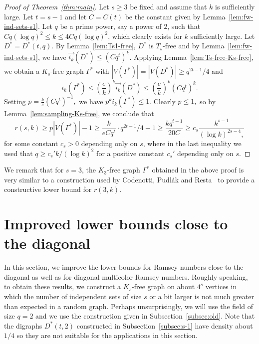 \documentclass{article}
\theoremstyle{plain}
\theoremstyle{definition}
\newcommand{\fwi}[1]{\overrightarrow{i_{#1}}}
\begin{document}
\begin{proof}[Proof of Theorem~\ref{thm:main}]
    Let $s \ge 3$ be fixed and assume that $k$ is sufficiently large. Let $t = s-1$ and let $C = C(t)$ be the constant given by Lemma~\ref{lem:fw-ind-sets-s1}. Let $q$ be a prime power, say a power of $2$, such that $C q (\log q)^2 \le k \le 4 C q (\log q)^2$, which clearly exists for $k$ sufficiently large. Let $D^* = D^*(t, q)$. By Lemma~\ref{lem:Ts1-free}, $D^*$ is $T_s$-free and by Lemma~\ref{lem:fw-ind-sets-s1}, we have $\fwi{k}(D^*) \le (Cq^t)^k$. Applying Lemma~\ref{lem:Ts-free-Ks-free}, we obtain a $K_s$-free graph $\Gamma^*$ with $|V(\Gamma^*)| = |V(D^*)| \ge q^{2t-1} / 4$ and 
    \[ i_k(\Gamma^*) \le \left( \frac{e}{k} \right)^k \fwi{k}(D^*) \le \left(\frac{e}{k}\right)^k (C q^t)^k. \]
    Setting $p = \frac{k}{e} (C q^t)^{-1},$ we have $p^k i_k(\Gamma^*) \le 1$. Clearly $p \le 1,$ so by Lemma~\ref{lem:sampling-Ks-free}, we conclude that
    \[ r(s, k) \ge p |V(\Gamma^*)| - 1 \ge \frac{k}{e C q^t} \cdot q^{2t-1} / 4 - 1 \ge \frac{k q^{t-1}}{20 C} \ge c_s \frac{k^{s-1}}{(\log k)^{2s-4},} \]
    for some constant $c_s > 0$ depending only on $s$, where in the last inequality we used that $q \ge c_s' k / (\log k)^2$ for a positive constant $c_s'$ depending only on $s$.
\end{proof}

We remark that for $s=3$, the $K_3$-free graph $\Gamma^*$ obtained in the above proof is very similar to a construction used by Codenotti, Pudl\'{a}k and Resta~\cite{codenotti-pudlak-resta} to provide a constructive lower bound for $r(3, k)$.

\section{Improved lower bounds close to the diagonal} \label{sec:close}
In this section, we improve the lower bounds for Ramsey numbers close to the diagonal as well as for diagonal multicolor Ramsey numbers. Roughly speaking, to obtain these results, we construct a $K_s$-free graph on about $4^s$ vertices in which the number of independent sets of size $s$ or a bit larger is not much greater than expected in a random graph. Perhaps unsurprisingly, we will use the field of size $q = 2$ and we use the construction given in Subsection~\ref{subsec:old}. Note that the digraphs $D^*(t, 2)$ constructed in Subsection~\ref{subsec:s-1} have density about $1/4$ so they are not suitable for the applications in this section.
\end{document}
